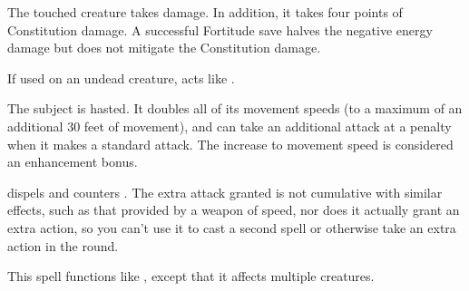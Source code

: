 \begin{comment}
\subsubsection{H}
\end{comment}

\spellrng{\rngtouch}
\begin{spelleffect}
  The touched creature takes damage. In addition, it takes four points of Constitution damage. A successful Fortitude save halves the negative energy damage but does not mitigate the Constitution damage.
\end{spelleffect}
\begin{spellnotes}
  If used on an undead creature,  acts like .
\end{spellnotes}

\spelldur{\durshort}
\begin{spelleffect}
  The subject is hasted. It doubles all of its movement speeds (to a maximum of an additional 30 feet of movement), and can take an additional attack at a  penalty when it makes a standard attack. The increase to movement speed is considered an enhancement bonus.
\end{spelleffect}
\begin{spellnotes}
   dispels and counters . The extra attack granted is not cumulative with similar effects, such as that provided by a weapon of speed, nor does it actually grant an extra action, so you can't use it to cast a second spell or otherwise take an extra action in the round.
\end{spellnotes}

\begin{spelleffect}
  This spell functions like , except that it affects multiple creatures.
\end{spelleffect}

